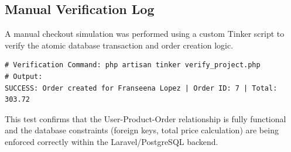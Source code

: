\subsection{Manual Verification Log}
A manual checkout simulation was performed using a custom Tinker script to verify the atomic database transaction and order creation logic.

\begin{lstlisting}[style=phpstyle]
# Verification Command: php artisan tinker verify_project.php
# Output:
SUCCESS: Order created for Franseena Lopez | Order ID: 7 | Total: 303.72
\end{lstlisting}

\noindent This test confirms that the User-Product-Order relationship is fully functional and the database constraints (foreign keys, total price calculation) are being enforced correctly within the Laravel/PostgreSQL backend.
